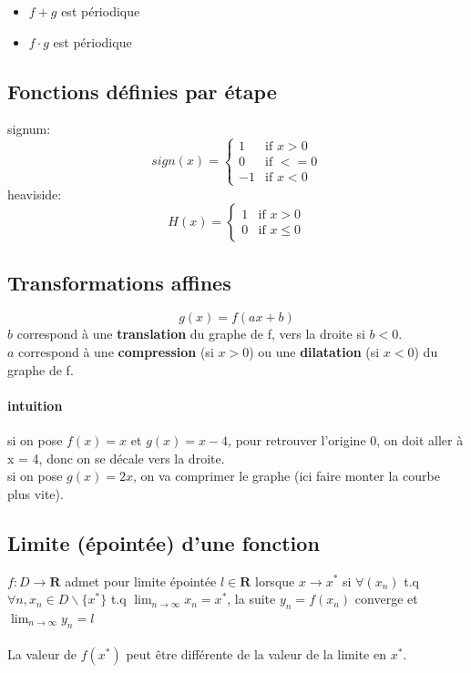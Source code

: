 \documentclass{article}
\begin{document}
\begin{itemize}
    \item $ f + g $ est périodique
    \item $ f \cdot g $ est périodique
\end{itemize}

\subsection{Fonctions définies par étape}

signum:
\begin{equation}
sign(x)=
    \begin{cases}
        1 & \text{if } x > 0\\
        0 & \text{if } < = 0\\
        -1 & \text{if } x < 0
    \end{cases}
\end{equation}
heaviside:
\begin{equation}
H(x)=
    \begin{cases}
        1 & \text{if } x > 0\\
        0 & \text{if } x \leq 0
    \end{cases}
\end{equation}

\subsection{Transformations affines}

\[ g(x) = f(ax + b) \]
$ b $ correspond à une \textbf{translation} du graphe de f, vers la droite si $b < 0$.\\
$ a $ correspond à une \textbf{compression} (si $ x > 0 $) ou une \textbf{dilatation} (si $x < 0$) du graphe de f.

\paragraph{intuition}
si on pose $ f(x) = x $ et $ g(x) = x - 4 $, pour retrouver l'origine 0, on doit aller à x = 4, donc on se décale vers la droite.\\
si on pose $ g(x) = 2x $, on va comprimer le graphe (ici faire monter la courbe plus vite).

\subsection{Limite (épointée) d'une fonction}

$ f : D \to \mathbf{R} $ admet pour limite épointée $ l \in \mathbf{R} $ lorsque $ x \to x^* $ si $ \forall (x_n) $ t.q $ \forall n, x_n \in D \backslash \{x^*\} $ t.q $ \lim_{n\to\infty} x_n = x^*$, la suite $ y_n = f(x_n) $ converge et $ \lim_{n\to\infty} y_n = l$\\\\
La valeur de $ f(x^*) $ peut être différente de la valeur de la limite en $ x^* $.
\end{document}
